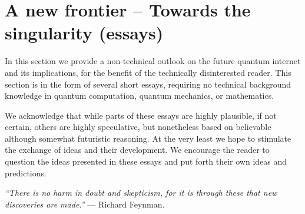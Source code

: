 %
%

\section{A new frontier -- Towards the singularity (essays)} \label{sec:outlook}  

In this section we provide a non-technical outlook on the future quantum internet and its implications, for the benefit of the technically disinterested reader. This section is in the form of several short essays, requiring no technical background knowledge in quantum computation, quantum mechanics, or mathematics.

We acknowledge that while parts of these essays are highly plausible, if not certain, others are highly speculative, but nonetheless based on believable although somewhat futuristic reasoning. At the very least we hope to stimulate the exchange of ideas and their development. We encourage the reader to question the ideas presented in these essays and put forth their own ideas and predictions.

\textit{``There is no harm in doubt and skepticism, for it is through these that new discoveries are made.''} --- Richard Feynman.

%
%



%
%



%
%



%
%



%
%



%
%



%
%



%
%

